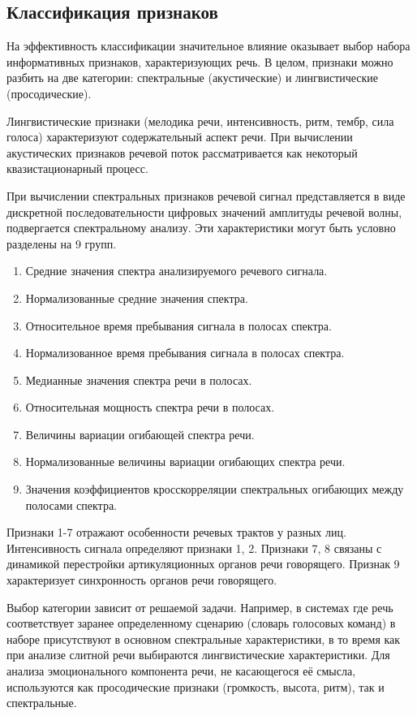 \subsection{Классификация признаков}
На эффективность классификации значительное влияние оказывает выбор набора информативных признаков, характеризующих речь. В целом, признаки можно разбить на две категории: спектральные (акустические) и лингвистические (просодические). \cite{schuller2011recognising}

Лингвистические признаки (мелодика речи, интенсивность, ритм, тембр, сила голоса) характеризуют содержательный аспект речи. При вычислении акустических признаков речевой поток рассматривается как некоторый квазистационарный процесс.

При вычислении спектральных признаков речевой сигнал представляется в виде дискретной последовательности
цифровых значений амплитуды речевой волны, подвергается спектральному анализу. Эти характеристики
могут быть условно разделены на 9 групп. \cite{розалиев2007построение}
\begin{enumerate}
	\item Средние значения спектра анализируемого речевого сигнала.
	\item Нормализованные средние значения спектра.
	\item Относительное время пребывания сигнала в полосах спектра.
	\item Нормализованное время пребывания сигнала в полосах спектра.
	\item Медианные значения спектра речи в полосах.
	\item Относительная мощность спектра речи в полосах.
	\item Величины вариации огибающей спектра речи.
	\item Нормализованные величины вариации огибающих спектра речи.
	\item Значения коэффициентов кросскорреляции спектральных огибающих между полосами спектра.
\end{enumerate}
Признаки 1-7 отражают особенности речевых трактов у разных лиц. Интенсивность сигнала определяют признаки 1, 2. Признаки 7, 8 связаны  с динамикой перестройки артикуляционных органов речи говорящего. Признак 9 характеризует синхронность органов речи говорящего.

Выбор категории зависит от решаемой задачи. Например, в системах где речь соответствует заранее определенному сценарию (словарь голосовых команд) в наборе присутствуют в основном спектральные характеристики, в то время как при анализе слитной речи выбираются лингвистические характеристики. Для анализа эмоционального компонента речи, не касающегося её смысла, используются как просодические признаки (громкость, высота, ритм), так и спектральные.
